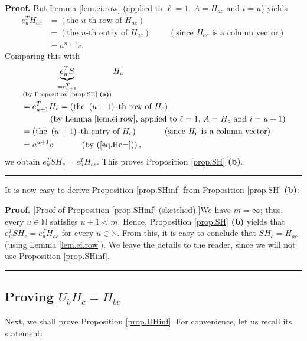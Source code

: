 \documentclass[numbers=enddot,12pt,final,onecolumn,notitlepage]{scrartcl}%
\theoremstyle{definition}
\newenvironment{proof}[1][Proof]{\noindent\textbf{#1.} }{\ \rule{0.5em}{0.5em}}
\newenvironment{verlong}{}{}
\begin{document}
\begin{verlong}
\begin{proof}
But Lemma \ref{lem.ei.row} (applied to $\ell=1$, $A=H_{ac}$ and $i=u$) yields%
\begin{align*}
e_{u}^{T}H_{ac}  &  =\left(  \text{the }u\text{-th row of }H_{ac}\right) \\
&  =\left(  \text{the }u\text{-th entry of }H_{ac}\right)
\ \ \ \ \ \ \ \ \ \ \left(  \text{since }H_{ac}\text{ is a column
vector}\right) \\
&  =a^{u+1}c.
\end{align*}
Comparing this with%
\begin{align*}
&  \underbrace{e_{u}^{T}S}_{\substack{=e_{u+1}^{T}\\\text{(by Proposition
\ref{prop.SH} \textbf{(a)})}}}H_{c}\\
&  =e_{u+1}^{T}H_{c}=\left(  \text{the }\left(  u+1\right)  \text{-th row of
}H_{c}\right) \\
&  \ \ \ \ \ \ \ \ \ \ \left(  \text{by Lemma \ref{lem.ei.row}, applied to
}\ell=1\text{, }A=H_{c}\text{ and }i=u+1\right) \\
&  =\left(  \text{the }\left(  u+1\right)  \text{-th entry of }H_{c}\right)
\ \ \ \ \ \ \ \ \ \ \left(  \text{since }H_{c}\text{ is a column
vector}\right) \\
&  =a^{u+1}c\ \ \ \ \ \ \ \ \ \ \left(  \text{by (\ref{eq.Hc=})}\right)  ,
\end{align*}
we obtain $e_{u}^{T}SH_{c}=e_{u}^{T}H_{ac}$. This proves Proposition
\ref{prop.SH} \textbf{(b)}.
\end{proof}
\end{verlong}

It is now easy to derive Proposition \ref{prop.SHinf} from Proposition
\ref{prop.SH} \textbf{(b)}:

\begin{proof}
[Proof of Proposition \ref{prop.SHinf} (sketched).]We have $m=\infty$; thus,
every $u\in\mathbb{N}$ satisfies $u+1<m$. Hence, Proposition \ref{prop.SH}
\textbf{(b)} yields that $e_{u}^{T}SH_{c}=e_{u}^{T}H_{ac}$ for every
$u\in\mathbb{N}$. From this, it is easy to conclude that $SH_{c}=H_{ac}$
(using Lemma \ref{lem.ei.row}). We leave the details to the reader, since we
will not use Proposition \ref{prop.SHinf}.
\end{proof}

\subsection{Proving $U_{b}H_{c}=H_{bc}$}

Next, we shall prove Proposition \ref{prop.UHinf}. For convenience, let us
recall its statement:
\end{document}
